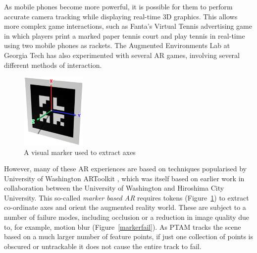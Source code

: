 \documentclass[a4paper,10pt]{article}
\begin{document}
As mobile phones become more powerful, it is possible for them to perform accurate camera tracking while displaying real-time 3D graphics. This allows more complex game interactions, such as Fanta's Virtual Tennis\cite{fantatennis} advertising game in which players print a marked paper tennis court and play tennis in real-time using two mobile phones as rackets. The Augmented Environments Lab at Georgia Tech has also experimented with several AR games, involving several different methods of interaction.

\begin{figure}
  \vspace{-20pt}
  \begin{center}
    \includegraphics[width=120px]{marker-axis1}
  \end{center}
  \vspace{-10pt}
  \caption{A visual marker used to extract axes}
  \label{markerar}
\end{figure} 

However, many of these AR experiences are based on techniques popularised by University of Washington ARToolkit \cite{artk}, which was itself based on earlier work \cite{artkpaper} in collaboration between the University of Washington and Hiroshima City University. This so-called \textit{marker based AR} requires tokens (Figure~\ref{markerar}) to extract co-ordinate axes and orient the augmented reality world. These are subject to a number of failure modes, including occlusion or a reduction in image quality due to, for example, motion blur (Figure~\ref{markerfail}). As PTAM tracks the scene based on a much larger number of feature points, if just one collection of points is obscured or untrackable it does not cause the entire track to fail.
\end{document}
